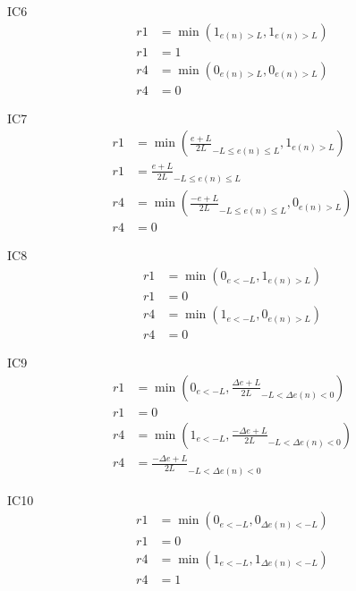 IC6
\begin{equation}
\begin{split}
    r1&=\min{\left(1_{e(n)>L},1_{e(n)>L}\right)}\\
    r1&=1\\
    r4&=\min{\left(0_{e(n)>L},0_{e(n)>L}\right)}\\
    r4&=0
\end{split}
\end{equation}

IC7
\begin{equation}
\begin{split}
    r1&=\min{\left(\frac{e+L}{2L}_{-L\leq e(n)\leq L},1_{e(n)>L}\right)}\\
    r1&=\frac{e+L}{2L}_{-L\leq e(n)\leq L}\\
    r4&=\min{\left(\frac{-e+L}{2L}_{-L\leq e(n)\leq L},0_{e(n)>L}\right)}\\
    r4&=0
\end{split}
\end{equation}

IC8
\begin{equation}
\begin{split}
    r1&=\min{\left(0_{e<-L},1_{e(n)>L}\right)}\\
    r1&=0\\
    r4&=\min{\left(1_{e<-L},0_{e(n)>L}\right)}\\
    r4&=0
\end{split}
\end{equation}

IC9
\begin{equation}
\begin{split}
    r1&=\min{\left(0_{e<-L},\frac{\Delta e+L}{2L}_{-L<\Delta e(n)<0}\right)}\\
    r1&=0\\
    r4&=\min{\left(1_{e<-L},\frac{-\Delta e+L}{2L}_{-L<\Delta e(n)<0}\right)}\\
    r4&=\frac{-\Delta e+L}{2L}_{-L<\Delta e(n)<0}
\end{split}
\end{equation}

IC10
\begin{equation}
\begin{split}
    r1&=\min{\left(0_{e<-L},0_{\Delta e(n)<-L}\right)}\\
    r1&=0\\
    r4&=\min{\left(1_{e<-L},1_{\Delta e(n)<-L}\right)}\\
    r4&=1
\end{split}
\end{equation}


